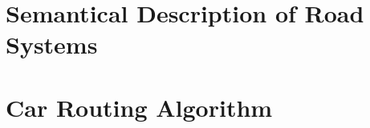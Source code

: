 \chapter{Semantical Description of Road Systems}
\label{ch:descriptionOfRoadSystems}

\chapter{Car Routing Algorithm}
\label{ch:gps}